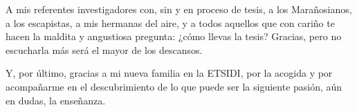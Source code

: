 A mis referentes investigadores con, sin y en proceso de tesis, a los Marañosianos, a los escapistas, a mis hermanas del aire, y a todos aquellos que con cariño te hacen la maldita y angustiosa pregunta: ¿cómo llevas la tesis? Gracias, pero no escucharla más será el mayor de los descansos.

Y, por último, gracias a mi nueva familia en la ETSIDI, por la acogida y por acompañarme en el descubrimiento de lo que puede ser la siguiente pasión, aún en dudas, la enseñanza.



